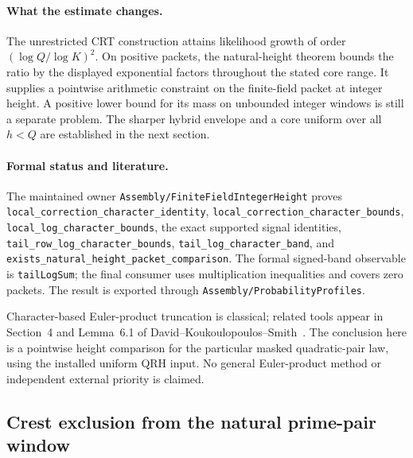 \documentclass[11pt]{article}
\begin{document}
\paragraph{What the estimate changes.}
The unrestricted CRT construction attains likelihood growth of order
\((\log Q/\log K)^2\). On positive packets, the natural-height theorem bounds the ratio
by the displayed exponential factors throughout the stated core range. It supplies a pointwise arithmetic constraint on the
finite-field packet at integer height. A positive lower bound for its
mass on unbounded integer windows is still a separate problem.
The sharper hybrid envelope and a core uniform over all \(h<Q\) are
established in the next section.

\paragraph{Formal status and literature.}
The maintained owner \texttt{Assembly/FiniteFieldIntegerHeight} proves
\texttt{local\_correction\_character\_identity},
\texttt{local\_correction\_character\_bounds},
\texttt{local\_log\_character\_bounds}, the exact supported signal
identities, \texttt{tail\_row\_log\_character\_bounds},
\texttt{tail\_log\_character\_band}, and
\texttt{exists\_natural\_height\_packet\_comparison}.
The formal signed-band observable is \texttt{tailLogSum}; the final
consumer uses multiplication inequalities and covers zero packets.
The result is exported through \texttt{Assembly/ProbabilityProfiles}.

Character-based Euler-product truncation is classical; related tools
appear in Section~4 and Lemma~6.1 of
David--Koukoulopoulos--Smith~\cite{DavidKoukoulopoulosSmith}.
The conclusion here is a pointwise height comparison for the particular
masked quadratic-pair law, using the installed uniform QRH input.
No general Euler-product method or independent external priority is claimed.

\subsection{Crest exclusion from the natural prime-pair window}
\end{document}
